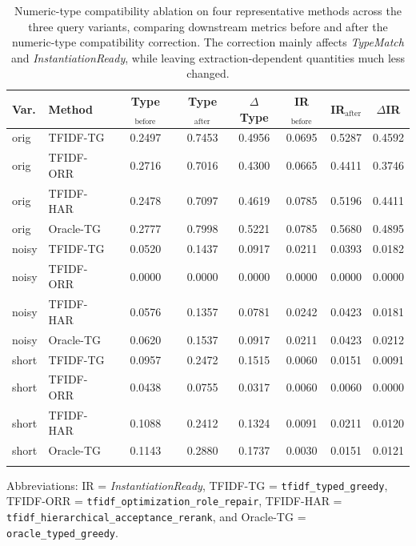 \documentclass[pdflatex,sn-basic,Numbered]{sn-jnl}
\begin{document}
\begin{table}[t]
  \centering
  \caption{Numeric-type compatibility ablation on four representative methods across the three query variants, comparing downstream metrics before and after the numeric-type compatibility correction. The correction mainly affects \textit{TypeMatch} and \textit{InstantiationReady}, while leaving extraction-dependent quantities much less changed.}
  \label{tab:nlp4lp-prefix-postfix}
  \small
  \setlength{\tabcolsep}{4pt}
  \begin{tabular}{llcccccc}
    \toprule
    Var. & Method & Type$_{\text{before}}$ & Type$_{\text{after}}$ & $\Delta$Type & IR$_{\text{before}}$ & IR$_{\text{after}}$ & $\Delta$IR \\
    \midrule
    orig  & TFIDF-TG  & 0.2497 & 0.7453 & 0.4956 & 0.0695 & 0.5287 & 0.4592 \\
    orig  & TFIDF-ORR & 0.2716 & 0.7016 & 0.4300 & 0.0665 & 0.4411 & 0.3746 \\
    orig  & TFIDF-HAR & 0.2478 & 0.7097 & 0.4619 & 0.0785 & 0.5196 & 0.4411 \\
    orig  & Oracle-TG & 0.2777 & 0.7998 & 0.5221 & 0.0785 & 0.5680 & 0.4895 \\
    \midrule
    noisy & TFIDF-TG  & 0.0520 & 0.1437 & 0.0917 & 0.0211 & 0.0393 & 0.0182 \\
    noisy & TFIDF-ORR & 0.0000 & 0.0000 & 0.0000 & 0.0000 & 0.0000 & 0.0000 \\
    noisy & TFIDF-HAR & 0.0576 & 0.1357 & 0.0781 & 0.0242 & 0.0423 & 0.0181 \\
    noisy & Oracle-TG & 0.0620 & 0.1537 & 0.0917 & 0.0211 & 0.0423 & 0.0212 \\
    \midrule
    short & TFIDF-TG  & 0.0957 & 0.2472 & 0.1515 & 0.0060 & 0.0151 & 0.0091 \\
    short & TFIDF-ORR & 0.0438 & 0.0755 & 0.0317 & 0.0060 & 0.0060 & 0.0000 \\
    short & TFIDF-HAR & 0.1088 & 0.2412 & 0.1324 & 0.0091 & 0.0211 & 0.0120 \\
    short & Oracle-TG & 0.1143 & 0.2880 & 0.1737 & 0.0030 & 0.0151 & 0.0121 \\
    \botrule
  \end{tabular}

  \vspace{2mm}
  \raggedright
  \footnotesize
  Abbreviations: IR = \textit{InstantiationReady}, TFIDF-TG = \texttt{tfidf\_typed\_greedy}, TFIDF-ORR = \texttt{tfidf\_optimization\_role\_repair}, TFIDF-HAR = \texttt{tfidf\_hierarchical\_acceptance\_rerank}, and Oracle-TG = \texttt{oracle\_typed\_greedy}.
\end{table}
\end{document}
